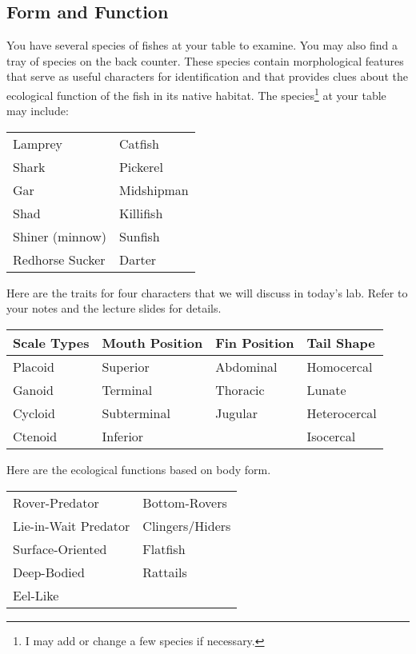 \documentclass[12pt, hidelinks]{exam}
\begin{document}
\subsection*{Form and Function}

You have several species of fishes at your table to examine.  You may also find a tray of species on the back counter. These species contain morphological features that serve as useful characters for identification and that provides clues about the ecological function of the fish in its native habitat.  The species\footnote{I may add or change a few species if necessary.} at your table may include:

\bigskip

\begin{tabular}{ll}
\toprule
Lamprey 		&	Catfish\\
Shark 			&	Pickerel\\
Gar 			&	Midshipman \\
Shad 			&	Killifish \\
Shiner (minnow)	&	Sunfish \\
Redhorse Sucker	&	Darter \\
\bottomrule
\end{tabular}

\bigskip

Here are the traits for four characters that we will discuss in today’s lab. Refer to your notes and the lecture slides for details.

\bigskip

\begin{tabular}{llll}
\toprule
Scale Types	& Mouth Position	& Fin Position	& Tail Shape \\
\midrule
Placoid		& Superior			& Abdominal		& Homocercal \\
Ganoid		& Terminal			& Thoracic		& Lunate \\
Cycloid		& Subterminal		& Jugular		& Heterocercal \\
Ctenoid		& Inferior			&				& Isocercal \\
\bottomrule
\end{tabular}

\bigskip

Here are the ecological functions based on body form.\bigskip

\begin{tabular}{ll}
\toprule
Rover-Predator 			&	Bottom-Rovers \\
Lie-in-Wait Predator 	&	Clingers/Hiders \\
Surface-Oriented 		&	Flatfish \\
Deep-Bodied 			&	Rattails \\
Eel-Like 				& 	 \\
\bottomrule
\end{tabular}
\end{document}
